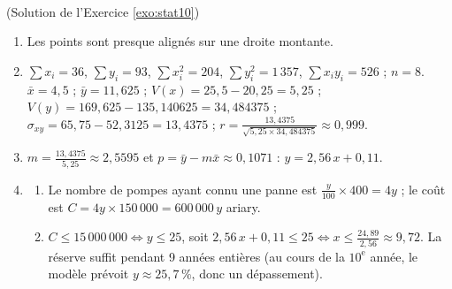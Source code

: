 \begin{corrige}
\begin{sol} ~ \\
(Solution de l'Exercice \ref{exo:stat10})
\begin{enumerate}
\item Les points sont presque align\'es sur une droite montante.
\item $\sum x_i = 36$, $\sum y_i = 93$, $\sum x_i^2 = 204$, $\sum y_i^2 = 1\,357$, $\sum x_i y_i = 526$ ; $n = 8$.
      $\bar{x} = 4,5$ ; $\bar{y} = 11,625$ ; $V(x) = 25,5 - 20,25 = 5,25$ ; $V(y) = 169,625 - 135,140625 = 34,484375$ ;
      $\sigma_{xy} = 65,75 - 52,3125 = 13,4375$ ; $r = \frac{13,4375}{\sqrt{5,25 \times 34,484375}} \approx 0,999$.
\item $m = \frac{13,4375}{5,25} \approx 2,5595$ et $p = \bar{y} - m\bar{x} \approx 0,1071$ : $\boxed{y = 2,56\,x + 0,11}$.
\item \begin{enumerate}
      \item Le nombre de pompes ayant connu une panne est $\frac{y}{100} \times 400 = 4y$ ; le co\^ut est 
            $C = 4y \times 150\,000 = 600\,000\, y$ ariary.
      \item $C \leq 15\,000\,000 \iff y \leq 25$, soit $2,56\,x + 0,11 \leq 25 \iff x \leq \frac{24,89}{2,56} \approx 9,72$.
            La r\'eserve suffit pendant 9 ann\'ees enti\`eres (au cours de la $10^{\text{e}}$ ann\'ee, le mod\`ele pr\'evoit
            $y \approx 25,7\,\%$, donc un d\'epassement).
      \end{enumerate}
\end{enumerate}
\end{sol}


\end{corrige}
